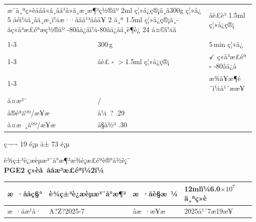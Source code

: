 \documentclass[UTF8,10pt,a4paper,fontset=fandol]{ctexart}
\newcommand{\fieldvalue}[1]{#1}
\newcommand{\handwritten}[1]{#1}
\begin{document}
\noindent
\begin{tabularx}{\textwidth}{|p{}|X|p{}|}
\hline
\multicolumn{2}{|p{0.56\textwidth}|}{æ¯ä¸ªç»èå­åå«å¸åå¹å»ä¸æ¸æ¶²ç½®äº 2ml ç¦»å¿ç®¡ä¸­ã300g ç¦»å¿ 5 åéï¼å¸åä¸æ¸ï¼æ··ååå¹³ååå¥ 2 ä¸ª 1.5ml ç¦»å¿ç®¡ä¸­ãç«å³æ£éªæç½®äº -80âä¿å­ï¼-80âä¿å­ä¸è¶è¿ 24 å¤©ï¼ã}
&
åè£è³ 1.5ml ç¦»å¿ç®¡
\\[-1mm]
&
&
\\
\cline{1-3}
&
\fieldvalue{\handwritten{300}}\,g
&
\fieldvalue{\handwritten{5}}\,min ç¦»å¿
\\
\cline{1-3}
&
åè£ $\square$ $>$1.5ml ç¦»å¿ç®¡
&
\fieldvalue{\(\checkmark\) ç«å³æ£éª}
\quad $\square$ -80âä¿å­
\\
\cline{1-3}
&
&
æ¾å¥æ¶é´ï¼\underline{\hspace{8mm}}å¹´\underline{\hspace{8mm}}æ\underline{\hspace{8mm}}æ¥
\\
\hline
å¤æ³¨ &
\fieldvalue{\handwritten{/}}
&
\\
\hline
å®éªäºº/æ¥æ &
\fieldvalue{\handwritten{å¼ ? \quad 2025.07.29}}
&
\\
\hline
å¤æ ¸äºº/æ¥æ &
\fieldvalue{\handwritten{å§ä½³ \quad 2025.07.30}}
\\
\hline
\end{tabularx}

\begin{center}
\small ç¬¬ 19 é¡µ å± 73 é¡µ
\end{center}

\newpage

\begin{center}
{\large è¾ç±³è¿æèµæ³¨å°æ¶²æ¾è¡æ£éªè®°å½è¡¨}\\[2pt]
\textbf{PGE2 ç»èå å­åæ³æ£éªï¼2ï¼}
\end{center}

\begin{tabularx}{\textwidth}{|l|X|l|X|}
\hline
æ ·ååç§° &
\fieldvalue{è¾ç±³è¿æèµæ³¨å°æ¶²} &
æ ·åè§æ ¼ &
\fieldvalue{12mlï¼6.0$\times 10^{7}$ä¸ªç»è}
\\ \hline
æ ·åæ¹å· &
\fieldvalue{\handwritten{A?Z?2025-7}} &
åæ ·æ¥æ &
\fieldvalue{\handwritten{2025å¹´7æ19æ¥}}
\\ \hline
\end{tabularx}
\end{document}
